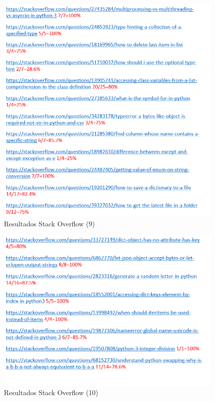 \documentclass[a4paper, 12pt]{book}
\begin{document}
\begin{figure}
	\centering
    \includegraphics[width=1\textwidth]{img/stack13}
    \caption{Resultados Stack Overflow (9)}
 \end{figure}
 
\begin{figure}
	\centering
    \includegraphics[width=1\textwidth]{img/stack14}
    \caption{Resultados Stack Overflow (10)}
 \end{figure}
 
\end{document}

